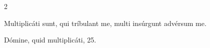 \documentclass[9pt,twoside]{extarticle}
\begin{document}
\begin{multicols}{2}
%
%
%
%
%
%
%
%
%
%
%
%
%
%
\begin{tightlist}{}
\item {} Multiplicáti sunt, qui tríbulant me, multi insúrgunt advérsum me.
\item {} Dómine, quid multiplicáti, 25.
\end{tightlist}

%
%
%
%
%
%
%
%
%


\end{multicols}
\end{document}
